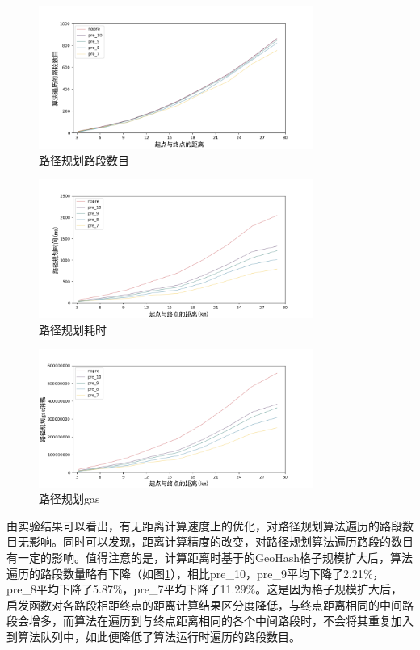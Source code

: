 \begin{figure}[h]
  \centering
  \includegraphics[height=0.3\textheight,width=0.8\textwidth]{figures/路径规划路段数目}
  \caption{路径规划路段数目}\label{fig:navRoads}
\end{figure}

\begin{figure}[h]
  \centering
  \includegraphics[height=0.3\textheight,width=0.8\textwidth]{figures/路径规划耗时}
  \caption{路径规划耗时}\label{fig:navTime}
\end{figure}

\begin{figure}[h]
  \centering
  \includegraphics[height=0.3\textheight,width=0.8\textwidth]{figures/路径规划gas}
  \caption{路径规划gas}\label{fig:navGas}
\end{figure}

由实验结果可以看出，有无距离计算速度上的优化，对路径规划算法遍历的路段数目无影响。同时可以发现，距离计算精度的改变，对路径规划算法遍历路段的数目有一定的影响。值得注意的是，计算距离时基于的GeoHash格子规模扩大后，算法遍历的路段数量略有下降（如图\ref{fig:navRoads}），相比pre\_10，pre\_9平均下降了2.21$\%$，pre\_8平均下降了5.87$\%$，pre\_7平均下降了11.29$\%$。这是因为格子规模扩大后，启发函数对各路段相距终点的距离计算结果区分度降低，与终点距离相同的中间路段会增多，而算法在遍历到与终点距离相同的各个中间路段时，不会将其重复加入到算法队列中，如此便降低了算法运行时遍历的路段数目。

